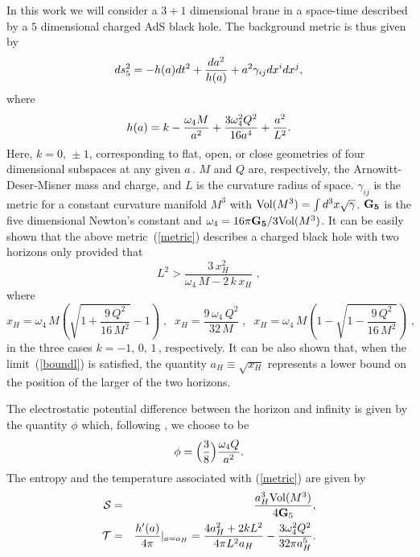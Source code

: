 \documentclass[a4paper,11pt]{article}
\begin{document}
In this work we will consider a $3+1$ dimensional brane in a space-time
described by a $5$ dimensional charged AdS black hole. The background
metric is thus given by \cite{CEJM,CS}
\begin{equation}
ds_{5}^2 = - h(a) dt^2 + {{da^2}\over{h(a)}} + a^2 \gamma_{ij} dx^i dx^j,
\label{metric}
\end{equation}
where 
\begin{equation}
h(a) = k - {\omega_{4} M\over{a^{2}}} + {3 \omega_{4}^2 Q^2
\over {16 a^{4}}} + {a^2\over{L^2}}.
\label{component}
\end{equation}
%
Here, $k = 0 ,\, \pm 1$, corresponding to flat, open, or close geometries
of four dimensional subspaces at any given $a\,$. $M$ and $Q$ are,
respectively, the  Arnowitt-Deser-Misner mass and charge, and $L$ is the
curvature radius of space. $\gamma_{ij}$ is the metric  for a constant
curvature manifold $M^3$ with ${\rm Vol} (M^3) = \int d^3x {\sqrt
\gamma}$. ${\bf G_5}$ is the five dimensional Newton's constant and
$\omega_4 = 16 \pi {\bf G_5}/ 3  {\rm Vol} (M^3)$. It can be easily shown
that the above metric~(\ref{metric}) describes a  charged black hole with
two horizons only provided that
%
\begin{equation}
L^2 > \frac{3 \, x_H^2}{\omega_4 \, M - 2 \, k \, x_H} \,\,,
\label{boundl}
\end{equation}
%
where
%
\begin{equation}
x_H = \omega_4 \, M \left( \sqrt{1+ \frac{9 \, Q^2}{16 \, M^2}} - 1 \right)
\;,\;\; x_H = \frac{9\,\omega_4\,Q^2}{32\,M} \;,\;\; x_H = \omega_4 \, M \left( 1 - \sqrt{1 - \frac{9 \, Q^2}{16 \, M^2}} \right) \,\,,
\end{equation}
%
in the three cases $k=-1,\,0,\,1\,$, respectively. It can be also shown
that, when the limit~(\ref{boundl}) is satisfied, the quantity $a_H \equiv
\sqrt{x_H}$ represents a lower bound on the position of the larger of the
two horizons.

The electrostatic potential difference between the horizon and infinity is
given by the quantity ${\phi}$ which, following \cite{CEJM}, we choose to be 
\begin{equation}
{ \phi} = \Big({3\over{8}}\Big){\omega_{4} Q\over{a^{2}}}.
\label{potential}
\end{equation}
The entropy and the temperature associated with (\ref{metric}) are given by
\begin{eqnarray}
{\cal {S}} &=& {a_H^3 {\rm Vol}(M^3)\over{4 {\bf G}_5}},\nonumber\\ 
{\cal {T}}  &=& {h^\prime (a)\over{4\pi}}|_{a=a_H} = 
{4 a_H^2 + 2 k L^2 \over{4\pi L^2 a_H}} - {3 \omega_4^2 Q^2 
\over {32 \pi a_H^5}}.
\label{st}
\end{eqnarray}
\end{document}

